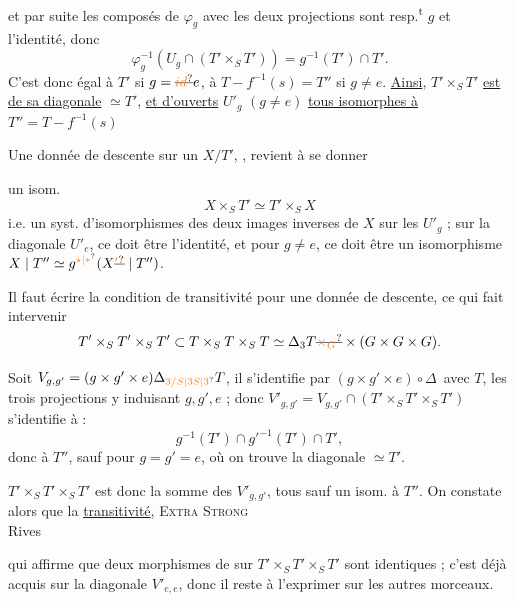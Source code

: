 et par suite les composés de $\varphi_g$ avec les deux projections sont resp.\textsuperscript{t} $g$ et l'identité, donc
\[
\varphi_g^{-1}(U_g\cap(T'\times_S T'))=g^{-1}(T')\cap T'.
\]
C'est donc égal à $T'$ si $g=\deleted{\unsure{id}}e$, à $T-f^{-1}(s)=T''$ si $g\ne e$. \uline{Ainsi}, $T'\times_S T'$ \uline{est}    \uline{de sa diagonale} $\simeq T'$, \uline{et d'ouverts} $U'_g$ $(g\ne e)$ \uline{tous isomorphes à} $T''=T-f^{-1}(s)$

Une donnée de descente sur un $X/T'$, , revient  à se donner
\textsc{}\\
 


un isom.
\[
X\times_S T'\simeq T'\times_S X
\]
i.e. un syst. d'isomorphismes des deux images inverses de $X$ sur les $U'_g$ ; sur la diagonale $U'_e$, ce doit être l'identité, et pour $g\ne e$, ce doit être un isomorphisme $X\mid T''\simeq g^{\unsure{\star|*}}(X\deleted{\unsure{'}}\mid T'')$.

Il faut écrire la condition de transitivité pour une donnée de descente, ce qui fait intervenir
\[
T'\times_S T'\times_S T'\subset T\times_S T\times_S T\simeq\Delta_3T\deleted{\unsure{\times_G}}\times(G\times G\times G).
\]

Soit $V_{g,g'}=(g\times g'\times e)\Delta_{\unsure{3/S|3S|3}}T$, il s'identifie par $(g\times g'\times e)\circ\Delta$\, avec $T$, les trois projections y induisant $g,g',e$ ; donc $V'_{g,g'}=V_{g,g'}\cap(T'\times_S T'\times_S T')$ s'identifie à :
\[
g^{-1}(T')\cap {g'}^{-1}(T')\cap T',
\]
donc à $T''$, sauf pour $g=g'=e$, où on trouve la diagonale $\simeq T'$.

$T'\times_S T'\times_S T'$ est donc la somme des $V'_{g,g'}$, tous sauf un isom. à $T''$. On constate alors que la \uline{transitivité},
\textsc{Extra Strong}\\
 Rives

qui affirme  que deux morphismes de  sur $T'\times_S T'\times_S T'$ sont identiques ; c'est déjà acquis sur la diagonale $V'_{e,e}$, donc il reste à l'exprimer sur les autres morceaux.

